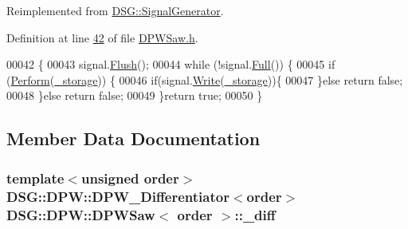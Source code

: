 Reimplemented from \hyperlink{class_d_s_g_1_1_signal_generator_ab050f80e84e6c8b3e354b56930d6a02b}{D\+S\+G\+::\+Signal\+Generator}.



Definition at line \hyperlink{_d_p_w_saw_8h_source_l00042}{42} of file \hyperlink{_d_p_w_saw_8h_source}{D\+P\+W\+Saw.\+h}.


\begin{DoxyCode}
00042                                                               \{
00043                 signal.\hyperlink{class_d_s_g_1_1_ring_buffer_ab23c8003d2857809a816068eeb209d60}{Flush}();
00044                 \textcolor{keywordflow}{while} (!signal.\hyperlink{class_d_s_g_1_1_ring_buffer_a53ddb04ffcbb5470a8d2b0a3c65b70cb}{Full}()) \{
00045                     \textcolor{keywordflow}{if} (\hyperlink{class_d_s_g_1_1_d_p_w_1_1_d_p_w_saw_a8d0bffad58e9bce19fe737302de749ed}{Perform}(\hyperlink{class_d_s_g_1_1_signal_generator_a28a9b47a1aa0783029f11a19ba0363f2}{\_storage})) \{
00046                         \textcolor{keywordflow}{if}(signal.\hyperlink{class_d_s_g_1_1_ring_buffer_aa5dd2caa0a270173251faee40a43d692}{Write}(\hyperlink{class_d_s_g_1_1_signal_generator_a28a9b47a1aa0783029f11a19ba0363f2}{\_storage}))\{
00047                         \}\textcolor{keywordflow}{else} \textcolor{keywordflow}{return} \textcolor{keyword}{false};
00048                     \}\textcolor{keywordflow}{else} \textcolor{keywordflow}{return} \textcolor{keyword}{false};
00049                 \}\textcolor{keywordflow}{return} \textcolor{keyword}{true};
00050             \}
\end{DoxyCode}


\subsection{Member Data Documentation}
\hypertarget{class_d_s_g_1_1_d_p_w_1_1_d_p_w_saw_af1ded15ce266aa7bd1594de38bba6890}{
\subsubsection[{\+\_\+diff}]{\setlength{\rightskip}{0pt plus 5cm}template$<$unsigned order$>$ {\bf D\+S\+G\+::\+D\+P\+W\+::\+D\+P\+W\+\_\+\+Differentiator}$<$order$>$ {\bf D\+S\+G\+::\+D\+P\+W\+::\+D\+P\+W\+Saw}$<$ order $>$\+::\+\_\+diff\hspace{0.3cm}{\ttfamily [protected]}}}\label{class_d_s_g_1_1_d_p_w_1_1_d_p_w_saw_af1ded15ce266aa7bd1594de38bba6890}


